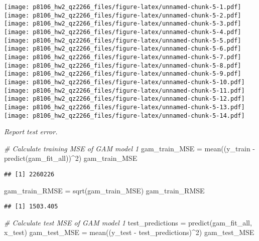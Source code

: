 \documentclass[
]{article}
\newenvironment{Shaded}{\begin{snugshade}}{\end{snugshade}}
\newcommand{\CommentTok}[1]{\textcolor[rgb]{0.56,0.35,0.01}{\textit{#1}}}
\newcommand{\DecValTok}[1]{\textcolor[rgb]{0.00,0.00,0.81}{#1}}
\newcommand{\FunctionTok}[1]{\textcolor[rgb]{0.00,0.00,0.00}{#1}}
\newcommand{\NormalTok}[1]{#1}
\newcommand{\OtherTok}[1]{\textcolor[rgb]{0.56,0.35,0.01}{#1}}
\newcommand{\SpecialCharTok}[1]{\textcolor[rgb]{0.00,0.00,0.00}{#1}}
\begin{document}
\texttt{[image: p8106\_hw2\_qz2266\_files/figure-latex/unnamed-chunk-5-1.pdf]}
\texttt{[image: p8106\_hw2\_qz2266\_files/figure-latex/unnamed-chunk-5-2.pdf]}
\texttt{[image: p8106\_hw2\_qz2266\_files/figure-latex/unnamed-chunk-5-3.pdf]}
\texttt{[image: p8106\_hw2\_qz2266\_files/figure-latex/unnamed-chunk-5-4.pdf]}
\texttt{[image: p8106\_hw2\_qz2266\_files/figure-latex/unnamed-chunk-5-5.pdf]}
\texttt{[image: p8106\_hw2\_qz2266\_files/figure-latex/unnamed-chunk-5-6.pdf]}
\texttt{[image: p8106\_hw2\_qz2266\_files/figure-latex/unnamed-chunk-5-7.pdf]}
\texttt{[image: p8106\_hw2\_qz2266\_files/figure-latex/unnamed-chunk-5-8.pdf]}
\texttt{[image: p8106\_hw2\_qz2266\_files/figure-latex/unnamed-chunk-5-9.pdf]}
\texttt{[image: p8106\_hw2\_qz2266\_files/figure-latex/unnamed-chunk-5-10.pdf]}
\texttt{[image: p8106\_hw2\_qz2266\_files/figure-latex/unnamed-chunk-5-11.pdf]}
\texttt{[image: p8106\_hw2\_qz2266\_files/figure-latex/unnamed-chunk-5-12.pdf]}
\texttt{[image: p8106\_hw2\_qz2266\_files/figure-latex/unnamed-chunk-5-13.pdf]}
\texttt{[image: p8106\_hw2\_qz2266\_files/figure-latex/unnamed-chunk-5-14.pdf]}

\emph{Report test error.}

\begin{Shaded}
\begin{Highlighting}[]
\CommentTok{\# Calculate training MSE of GAM model 1}
\NormalTok{gam\_train\_MSE }\OtherTok{=} \FunctionTok{mean}\NormalTok{((y\_train }\SpecialCharTok{{-}} \FunctionTok{predict}\NormalTok{(gam\_fit\_all))}\SpecialCharTok{\^{}}\DecValTok{2}\NormalTok{)}
\NormalTok{gam\_train\_MSE}
\end{Highlighting}
\end{Shaded}

\begin{verbatim}
## [1] 2260226
\end{verbatim}

\begin{Shaded}
\begin{Highlighting}[]
\NormalTok{gam\_train\_RMSE }\OtherTok{=} \FunctionTok{sqrt}\NormalTok{(gam\_train\_MSE)}
\NormalTok{gam\_train\_RMSE}
\end{Highlighting}
\end{Shaded}

\begin{verbatim}
## [1] 1503.405
\end{verbatim}

\begin{Shaded}
\begin{Highlighting}[]
\CommentTok{\# Calculate test MSE of GAM model 1}
\NormalTok{test\_predictions }\OtherTok{=} \FunctionTok{predict}\NormalTok{(gam\_fit\_all, x\_test)}
\NormalTok{gam\_test\_MSE }\OtherTok{=} \FunctionTok{mean}\NormalTok{((y\_test }\SpecialCharTok{{-}}\NormalTok{ test\_predictions)}\SpecialCharTok{\^{}}\DecValTok{2}\NormalTok{)}
\NormalTok{gam\_test\_MSE}
\end{Highlighting}
\end{Shaded}
\end{document}
